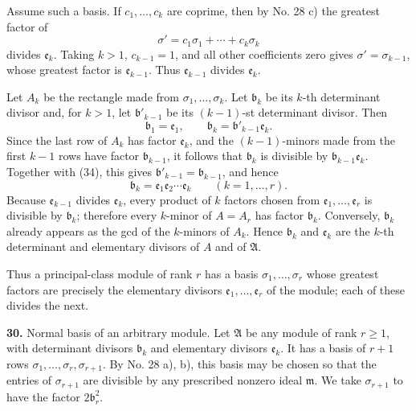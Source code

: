 \documentclass[11pt,a4paper]{article}
\begin{document}
Assume such a basis. If \(c_1,\ldots,c_k\) are coprime, then by No. 28 c) the greatest factor of
\[
 \sigma'=c_1\sigma_1+\cdots+c_k\sigma_k \tag{33}
\]
divides \(\mathfrak e_k\). Taking \(k>1\), \(c_{k-1}=1\), and all other coefficients zero gives \(\sigma'=\sigma_{k-1}\), whose greatest factor is \(\mathfrak e_{k-1}\). Thus \(\mathfrak e_{k-1}\) divides \(\mathfrak e_k\).

Let \(A_k\) be the rectangle made from \(\sigma_1,\ldots,\sigma_k\). Let \(\mathfrak b_k\) be its \(k\)-th determinant divisor and, for \(k>1\), let \(\mathfrak b'_{k-1}\) be its \((k-1)\)-st determinant divisor. Then
\[
 \mathfrak b_1=\mathfrak e_1,\qquad \mathfrak b_k=\mathfrak b'_{k-1}\mathfrak e_k. \tag{34}
\]
Since the last row of \(A_k\) has factor \(\mathfrak e_k\), and the \((k-1)\)-minors made from the first \(k-1\) rows have factor \(\mathfrak b_{k-1}\), it follows that \(\mathfrak b_k\) is divisible by \(\mathfrak b_{k-1}\mathfrak e_k\). Together with (34), this gives \(\mathfrak b'_{k-1}=\mathfrak b_{k-1}\), and hence
\[
 \mathfrak b_k=\mathfrak e_1\mathfrak e_2\cdots\mathfrak e_k
 \qquad(k=1,\ldots,r). \tag{35}
\]
Because \(\mathfrak e_{k-1}\) divides \(\mathfrak e_k\), every product of \(k\) factors chosen from \(\mathfrak e_1,\ldots,\mathfrak e_r\) is divisible by \(\mathfrak b_k\); therefore every \(k\)-minor of \(A=A_r\) has factor \(\mathfrak b_k\). Conversely, \(\mathfrak b_k\) already appears as the gcd of the \(k\)-minors of \(A_k\). Hence \(\mathfrak b_k\) and \(\mathfrak e_k\) are the \(k\)-th determinant and elementary divisors of \(A\) and of \(\mathfrak A\).

Thus a principal-class module of rank \(r\) has a basis \(\sigma_1,\ldots,\sigma_r\) whose greatest factors are precisely the elementary divisors \(\mathfrak e_1,\ldots,\mathfrak e_r\) of the module; each of these divides the next.

\textbf{30.} Normal basis of an arbitrary module. Let \(\mathfrak A\) be any module of rank \(r\ge1\), with determinant divisors \(\mathfrak b_k\) and elementary divisors \(\mathfrak e_k\). It has a basis of \(r+1\) rows \(\sigma_1,\ldots,\sigma_r,\sigma_{r+1}\). By No. 28 a), b), this basis may be chosen so that the entries of \(\sigma_{r+1}\) are divisible by any prescribed nonzero ideal \(\mathfrak m\). We take \(\sigma_{r+1}\) to have the factor \(2\mathfrak b_r^2\).
\end{document}
